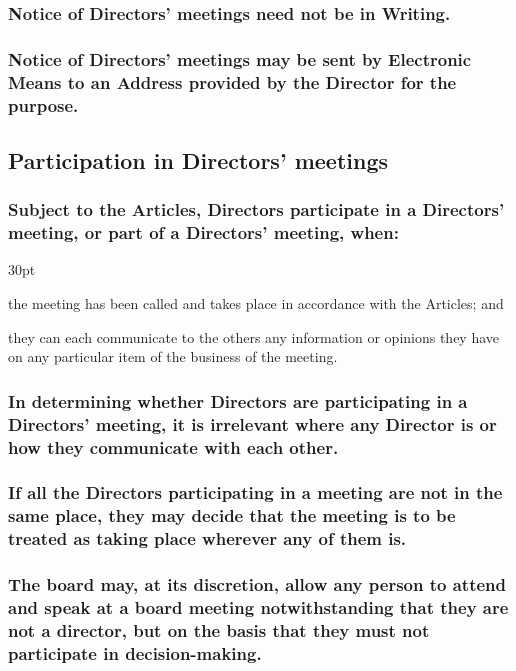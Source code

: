 \documentclass[12pt]{article}
\def\clauseindent{30pt}
\newenvironment{subindentpara}{\raggedright\begin{adjustwidth}{\clauseindent}{}\begin{hanginglist}}{\end{hanginglist}\end{adjustwidth}}
\begin{document}
\subsubsection{Notice of Directors' meetings need not be in Writing.}
\subsubsection[Notice of Directors' meetings by Electronic Means]{Notice of Directors' meetings may be sent by Electronic Means to an Address provided by the Director for the purpose.}

\subsection{Participation in Directors' meetings}
\subsubsection[Specifics of participation in Directors' meetings]{Subject to the Articles, Directors participate in a Directors' meeting, or part of a Directors' meeting, when:}
\begin{subindentpara}
  \item the meeting has been called and takes place in accordance with the Articles; and
  \item they can each communicate to the others any information or opinions they have on any particular item of the business of the meeting.
\end{subindentpara}
\subsubsection[Location of participation in Director's meetings is irrelevantt]{In determining whether Directors are participating in a Directors' meeting, it is irrelevant where any Director is or how they communicate with each other.}
\subsubsection[Nominal location of a meeting is at Directors' discretion]{If all the Directors participating in a meeting are not in the same place, they may decide that the meeting is to be treated as taking place wherever any of them is.}
\subsubsection[Directors' may authorise any person to speak at a meeting]{The board may, at its discretion, allow any person to attend and speak at a board meeting notwithstanding that they are not a director, but on the basis that they must not participate in decision-making.}
\end{document}
